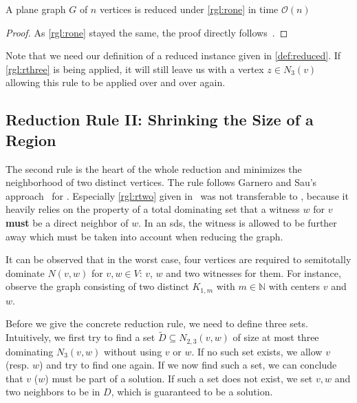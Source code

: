 \begin{lemma}\label{complex:rone}
    A plane graph $G$ of $n$ vertices is reduced under \cref{rgl:rone} in time $\mathcal{O}(n)$
\end{lemma}
\begin{proof}
    As \cref{rgl:rone} stayed the same, the proof directly follows~\cite[Lemma 2]{Alber2004}.
\end{proof}

Note that we need our definition of a reduced instance given in \cref{def:reduced}. 
If \cref{rgl:rthree} is being applied, it will still leave us with a vertex $z\in N_3(v)$ allowing this rule to be applied over and over again.
\subsection{Reduction Rule II: Shrinking the Size of a Region}

The second rule is the heart of the whole reduction and minimizes the neighborhood of two distinct vertices. The rule follows Garnero and Sau's approach~\cite{Garnero2018} for \ptdom. Especially \cref{rgl:rtwo} given in~\cite[arXiv v2]{Garnero2018} was not transferable to \psdom, because it heavily relies on the property of a total dominating set that a witness $w$ for $v$ \textbf{must} be a direct neighbor of $w$. 
In an sds, the witness is allowed to be further away which must be taken into account when reducing the graph.


It can be observed that in the worst case, four vertices are required to semitotally dominate $N(v,w)$ for $v,w \in V$: $v$, $w$ and two witnesses for them. 
For instance, observe the graph consisting of two distinct $K_{1,m}$ with $m \in \mathbb{N}$ with centers $v$ and $w$.

Before we give the concrete reduction rule, we need to define three sets. Intuitively, we first try to find a set $\tilde D \subseteq N_{2,3}(v,w)$ of size at most three dominating $N_3(v,w)$ without using $v$ or $w$. If no such set exists, we allow $v$ (resp. $w$) and try to find one again. 
If we now find such a set, we can conclude that $v$ ($w$) must be part of a solution.
If such a set does not exist, we set $v,w$ and two neighbors to be in $D$, which is guaranteed to be a solution.

